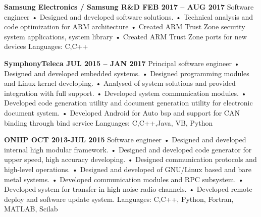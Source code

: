 \documentclass{article}
\begin{document}
\bigskip\noindent
\textbf{Samsung Electronics / Samsung R\&D FEB 2017 – AUG 2017}
Software engineer
• Designed and developed software solutions.
• Technical analysis and code optimization for ARM architecture
• Created ARM Trust Zone security system applications, system library
• Created ARM Trust Zone ports for new devices
Languages: C,C++

\bigskip\noindent
\textbf{SymphonyTeleca JUL 2015 – JAN 2017}
Principal software engineer
• Designed and developed embedded systems.
• Designed programming modules and Linux kernel developing.
• Analysed of system solutions and provided integration with full support.
• Developed system communication modules.
• Developed code generation utility and document generation utility for electronic document system.
• Developed Android for Auto bsp and support for CAN binding through bind service
Languages: C,C++,Java, VB, Python

\bigskip\noindent
\textbf{ONIIP OCT 2013-JUL 2015}
Software engineer
• Designed and developed internal high modular framework.
• Designed and developed code generator for upper speed, high accuracy developing.
• Designed communication protocols and high-level operations.
• Designed and developed of GNU/Linux based and bare metal systems.
• Developed communication modules and RPC subsystem.
• Developed system for transfer in high noise radio channels.
• Developed remote deploy and software update system.
Languages: C,C++, Python, Fortran, MATLAB, Scilab
\end{document}
